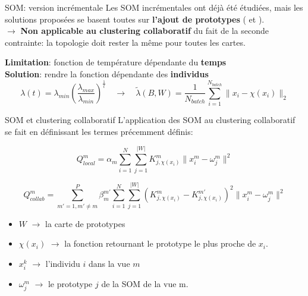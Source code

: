 \documentclass[hyperref={pdfpagelabels=false}]{beamer}
\begin{document}
        \begin{frame}{SOM: version incrémentale}
            Les SOM incrémentales ont déjà été étudiées, mais les solutions 
            proposées se basent toutes sur \textbf{l'ajout de prototypes} 
            (\cite{paplinski2012incremental} et \cite{deng2000esom}).\\
            $\rightarrow$ \textbf{Non applicable au clustering collaboratif} du 
            fait de la seconde contrainte: la topologie doit rester la même pour 
            toutes les cartes.

            \textbf{Limitation}: fonction de température dépendante du 
            \textbf{temps}\\
            \textbf{Solution}: rendre la fonction dépendante des 
            \textbf{individus}
            \begin{equation*}
                \lambda(t) = 
                \lambda_{min}\left(\frac{\lambda_{max}}{\lambda_{min}}\right)^{\frac{1}{t}}
                \quad\rightarrow\quad
                \widetilde{\lambda}(B, W) = 
                \frac{1}{N_{batch}}\sum_{i=1}^{N_{batch}}\|x_i - \chi(x_i)\|_2
            \end{equation*}
            \vspace{.1cm}
        \end{frame}

        \begin{frame}{SOM et clustering collaboratif}
            L'application des SOM au clustering collaboratif se fait en 
            définissant les termes précemment définis:

            \begin{equation*}
            {Q}^m_{local} = 
            \alpha_m\sum_{i=1}^{N}\sum_{j=1}^{|W|}{K}^m_{j, 
            \chi(x_i)}\|x_i^m - \omega_j^m\|^2
            \end{equation*}

            \begin{equation*}
            {Q}^m_{collab} = \sum_{m'=1, m'\neq 
            m}^{P}\beta_m^{m'}\sum_{i=1}^{N}\sum_{j=1}^{|W|}({K}^m_{j, 
            \chi(x_i)} - {K}^{m'}_{j, \chi(x_i)})^2  \|x_i^m - \omega_j^m\|^2
            \end{equation*}

            \begin{itemize}
                \item $W$ $\rightarrow$ la carte de prototypes
                \item $\chi(x_i)$ $\rightarrow$ la fonction retournant le 
                    prototype le plus proche de $x_i$.
                \item $x_i^k$ $\rightarrow$ l'individu $i$ dans la vue $m$
                \item $\omega_j^m$ $\rightarrow$ le prototype $j$ de la SOM de 
                    la vue m.
            \end{itemize}
        \end{frame}
    
\end{document}
